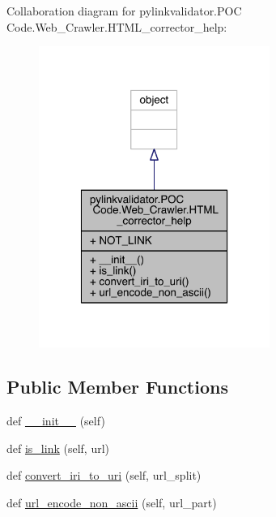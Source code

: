 Collaboration diagram for pylinkvalidator.\+P\+OC Code.\+Web\+\_\+\+Crawler.\+H\+T\+M\+L\+\_\+corrector\+\_\+help\+:
\nopagebreak
\begin{figure}[H]
\begin{center}
\leavevmode
\includegraphics[width=214pt]{classpylinkvalidator_1_1_p_o_c_01_code_1_1_web___crawler_1_1_h_t_m_l__corrector__help__coll__graph}
\end{center}
\end{figure}
\subsection*{Public Member Functions}
\begin{DoxyCompactItemize}
\item 
def \hyperlink{classpylinkvalidator_1_1_p_o_c_01_code_1_1_web___crawler_1_1_h_t_m_l__corrector__help_a74a8cbe051183c34bc6326175808b44a}{\+\_\+\+\_\+init\+\_\+\+\_\+} (self)
\item 
def \hyperlink{classpylinkvalidator_1_1_p_o_c_01_code_1_1_web___crawler_1_1_h_t_m_l__corrector__help_ac5786be0512ad6da9959426d38890919}{is\+\_\+link} (self, url)
\item 
def \hyperlink{classpylinkvalidator_1_1_p_o_c_01_code_1_1_web___crawler_1_1_h_t_m_l__corrector__help_af6b498d8b0c15bd9e103906e099e48f5}{convert\+\_\+iri\+\_\+to\+\_\+uri} (self, url\+\_\+split)
\item 
def \hyperlink{classpylinkvalidator_1_1_p_o_c_01_code_1_1_web___crawler_1_1_h_t_m_l__corrector__help_ac8fb606d19d641436906401f41a1ca2f}{url\+\_\+encode\+\_\+non\+\_\+ascii} (self, url\+\_\+part)
\end{DoxyCompactItemize}
